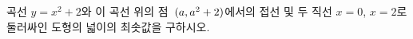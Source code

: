 곡선 $y=x^2+2$와 이 곡선 위의 점~$(a{,}\mkern3mu\mathopen{}a^2+2)$에서의 접선 및 두 직선 $x=0$, $x=2$로 둘러싸인 도형의 넓이의 최솟값을 구하시오. 
